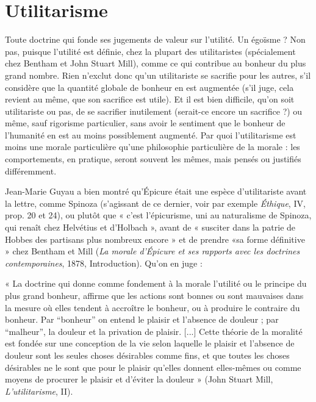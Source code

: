 \section{Utilitarisme}
Toute doctrine qui fonde ses jugements de valeur sur l’utilité.
Un égoïsme ? Non pas, puisque l’utilité est définie,
chez la plupart des utilitaristes (spécialement chez Bentham et John Stuart
Mill), comme ce qui contribue au bonheur du plus grand nombre. Rien
n'exclut donc qu’un utilitariste se sacrifie pour les autres, s’il considère que la
quantité globale de bonheur en est augmentée (s’il juge, cela revient au même,
que son sacrifice est utile). Et il est bien difficile, qu’on soit utilitariste ou pas,
de se sacrifier inutilement (serait-ce encore un sacrifice ?) ou même, sauf rigorisme
particulier, sans avoir le sentiment que le bonheur de l'humanité en est
au moins possiblement augmenté. Par quoi l’utilitarisme est moins une morale
particulière qu’une philosophie particulière de la morale : les comportements,
en pratique, seront souvent les mêmes, mais pensés ou justifiés différemment.

Jean-Marie Guyau a bien montré qu’Épicure était une espèce d’utilitariste
avant la lettre, comme Spinoza (s'agissant de ce dernier, voir par exemple
{\it Éthique}, IV, prop. 20 et 24), ou plutôt que « c’est l’épicurisme, uni au naturalisme
de Spinoza, qui renaît chez Helvétius et d’Holbach », avant de « susciter
dans la patrie de Hobbes des partisans plus nombreux encore » et de prendre
«sa forme définitive » chez Bentham et Mill ({\it La morale d'Épicure et ses rapports
avec les doctrines contemporaines}, 1878, Introduction). Qu’on en juge :

« La doctrine qui donne comme fondement à la morale l'utilité ou le principe du
plus grand bonheur, affirme que les actions sont bonnes ou sont mauvaises dans la
mesure où elles tendent à accroître le bonheur, ou à produire le contraire du bonheur.
Par “bonheur” on entend le plaisir et l’absence de douleur ; par “malheur”, la douleur
et la privation de plaisir. [...] Cette théorie de la moralité est fondée sur une conception
de la vie selon laquelle le plaisir et l’absence de douleur sont les seules choses désirables
comme fins, et que toutes les choses désirables ne le sont que pour le plaisir qu’elles
donnent elles-mêmes ou comme moyens de procurer le plaisir et d’éviter la douleur »
(John Stuart Mill, {\it L'utilitarisme}, II).

